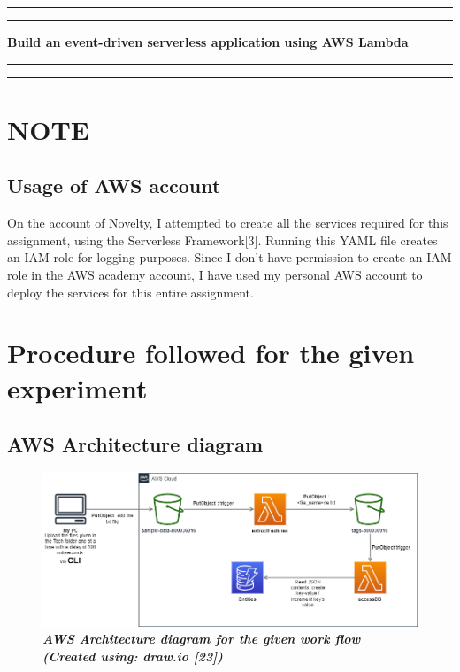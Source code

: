 
\newpage

\begin{flushright}
  \vspace{10cm}
  \rule{18cm}{5pt}
  \rule{18cm}{2pt}\vskip1cm
  \begin{center}
    \begin{bfseries}
      \Huge{\textbf{Build an event-driven serverless application using AWS Lambda}}\\
    \end{bfseries}
  \end{center}
  \vspace{1cm}
  \rule{18cm}{2pt}
  \rule{18cm}{5pt}
\end{flushright}
\newpage

\chapter{NOTE}
\section{Usage of AWS account}
On the account of Novelty, I attempted to create all the services required for this assignment, using the Serverless Framework[3]. Running this YAML file creates an IAM role for logging purposes.
Since I don't have permission to create an IAM role in the AWS academy account, I have used my personal AWS account to deploy the services for this entire assignment.

\chapter{Procedure followed for the given experiment}
    \section{AWS Architecture diagram}


    \begin{figure}[htp]
        \centering
        \includegraphics[scale=1, width=15cm]{PROBLEM 2/Screenshots/SDP-A3-Part B - Flowchart.png}
        \caption{\textbf{\textit{AWS Architecture diagram for the given work flow (Created using: draw.io [23])}}}
        \label{fig:aws-arch-diag}
    \end{figure}
